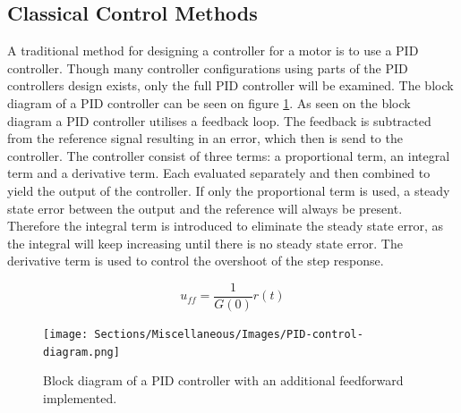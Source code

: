 \documentclass[../../main.tex]{subfiles}
\begin{document}
\subsection*{Classical Control Methods}
A traditional method for designing a controller for a motor is to use a PID controller. Though many controller configurations using parts of the PID controllers design exists, only the full PID controller will be examined. The block diagram of a PID controller can be seen on figure \ref{fig:PID_controller}. As seen on the block diagram
a PID controller utilises a feedback loop. The feedback is subtracted from the reference signal resulting in an error, which then is send to the controller. The controller consist of three terms: a proportional term, an integral term and a derivative term. Each evaluated separately and then combined to yield the output of the controller. If only the proportional term is used, a steady state error between the output and the reference will always be present. Therefore the integral term is introduced to eliminate the steady state error, as the integral will keep increasing until there is no steady state error. The derivative term is used to control the overshoot of the step response.

\begin{equation}\label{eq:feedforward}
    u_{ff}=\frac{1}{G(0)}r(t)
\end{equation}
\begin{figure}[]
    \centering
    \texttt{[image: Sections/Miscellaneous/Images/PID-control-diagram.png]}
    \caption{Block diagram of a PID controller with an additional feedforward implemented.}
    \label{fig:PID_controller}
\end{figure}

\end{document}
